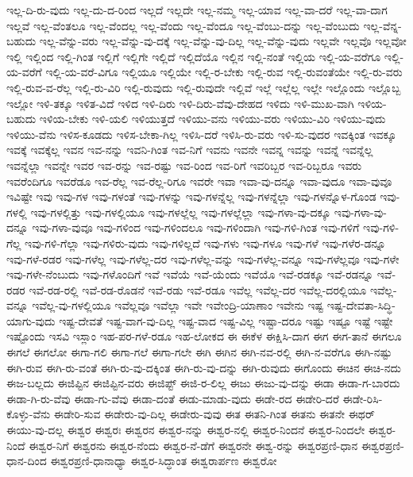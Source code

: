 {ಇಲ್ಲ-ದಿ-ರು-ವುದು
ಇಲ್ಲ-ದು-ದ-ರಿಂದ
ಇಲ್ಲದೆ
ಇಲ್ಲದೇ
ಇಲ್ಲ-ನಮ್ಮ
ಇಲ್ಲ-ಯಾವ
ಇಲ್ಲ-ವಾ-ದರೆ
ಇಲ್ಲ-ವಾ-ದಾಗ
ಇಲ್ಲವೆ
ಇಲ್ಲ-ವೆಂತಲೂ
ಇಲ್ಲ-ವೆಂದಲ್ಲ
ಇಲ್ಲ-ವೆಂದು
ಇಲ್ಲ-ವೆಂದೂ
ಇಲ್ಲ-ವೆಂಬು-ದನ್ನು
ಇಲ್ಲ-ವೆಂಬುದು
ಇಲ್ಲ-ವೆನ್ನ-ಬಹುದು
ಇಲ್ಲ-ವೆನ್ನು-ವರು
ಇಲ್ಲ-ವೆನ್ನು-ವು-ದಕ್ಕೆ
ಇಲ್ಲ-ವೆನ್ನು-ವು-ದಿಲ್ಲ
ಇಲ್ಲ-ವೆನ್ನು-ವುದು
ಇಲ್ಲವೇ
ಇಲ್ಲವೊ
ಇಲ್ಲವೋ
ಇಲ್ಲಿ
ಇಲ್ಲಿಂದ
ಇಲ್ಲಿ-ಗಿಂತ
ಇಲ್ಲಿಗೆ
ಇಲ್ಲಿಗೇ
ಇಲ್ಲಿದೆ
ಇಲ್ಲಿದೆಯೊ
ಇಲ್ಲಿನ
ಇಲ್ಲಿ-ನಂತೆ
ಇಲ್ಲಿಯ
ಇಲ್ಲಿ-ಯ-ವರೆಗೂ
ಇಲ್ಲಿ-ಯ-ವರೆಗೆ
ಇಲ್ಲಿ-ಯ-ವರೆ-ವಿಗೂ
ಇಲ್ಲಿಯೂ
ಇಲ್ಲಿಯೇ
ಇಲ್ಲಿ-ರ-ಬೇಕು
ಇಲ್ಲಿ-ರುವ
ಇಲ್ಲಿ-ರುವಂತೆಯೇ
ಇಲ್ಲಿ-ರು-ವರು
ಇಲ್ಲಿ-ರುವ-ವ-ರೆಲ್ಲ
ಇಲ್ಲಿ-ರು-ವಿರಿ
ಇಲ್ಲಿ-ರುವುದು
ಇಲ್ಲಿ-ರುವುದೇ
ಇಲ್ಲಿವೆ
ಇಲ್ಲೆ
ಇಲ್ಲೆಲ್ಲ
ಇಲ್ಲೇ
ಇಲ್ಲೊಂದು
ಇಲ್ಲೊಬ್ಬ
ಇಲ್ಲೋ
ಇಳಿ-ತಕ್ಕೂ
ಇಳಿತ-ವಿದೆ
ಇಳಿದ
ಇಳಿ-ದಿರು
ಇಳಿ-ದಿರು-ವೆವು-ದೇಹದ
ಇಳಿದು
ಇಳಿ-ಮುಖ-ವಾಗಿ
ಇಳಿಯ-ಬಹುದು
ಇಳಿಯ-ಬೇಕು
ಇಳಿ-ಯಲಿ
ಇಳಿಯುತ್ತದೆ
ಇಳಿಯು-ವನು
ಇಳಿಯು-ವರು
ಇಳಿಯು-ವಿರಿ
ಇಳಿಯು-ವುದು
ಇಳಿಯು-ವೆನು
ಇಳಿಸ-ಕೂಡದು
ಇಳಿಸ-ಬೇಕಾ-ಗಿಲ್ಲ
ಇಳಿಸಿ-ದರೆ
ಇಳಿಸಿ-ರು-ವರು
ಇಳಿ-ಸು-ವುದರ
ಇವಕ್ಕಿಂತ
ಇವಕ್ಕೂ
ಇವಕ್ಕೆ
ಇವಕ್ಕೆಲ್ಲ
ಇವನ
ಇವ-ನನ್ನು
ಇವನಿ-ಗಿಂತ
ಇವ-ನಿಗೆ
ಇವನು
ಇವನೇ
ಇವನ್ನ
ಇವನ್ನು
ಇವನ್ನೆ
ಇವನ್ನೆಲ್ಲ
ಇವನ್ನೆಲ್ಲಾ
ಇವನ್ನೇ
ಇವರ
ಇವ-ರನ್ನು
ಇವ-ರಷ್ಟು
ಇವ-ರಿಂದ
ಇವ-ರಿಗೆ
ಇವರಿಬ್ಬರ
ಇವ-ರಿಬ್ಬರೂ
ಇವರು
ಇವರೆಂದಿಗೂ
ಇವರೆಡೂ
ಇವ-ರೆಲ್ಲ
ಇವ-ರೆಲ್ಲ-ರಿಗೂ
ಇವರೇ
ಇವಾ
ಇವಾ-ವು-ದನ್ನೂ
ಇವಾ-ವುದೂ
ಇವಾ-ವುವೂ
ಇವಿಷ್ಟೇ
ಇವು
ಇವು-ಗಳ
ಇವು-ಗಳಂತೆ
ಇವು-ಗಳನ್ನು
ಇವು-ಗಳನ್ನೆಲ್ಲ
ಇವು-ಗಳನ್ನೆಲ್ಲಾ
ಇವು-ಗಳನ್ನೊಳ-ಗೊಂಡ
ಇವು-ಗಳಲ್ಲಿ
ಇವು-ಗಳಲ್ಲಿತ್ತು
ಇವು-ಗಳಲ್ಲಿಯೂ
ಇವು-ಗಳಲ್ಲೆಲ್ಲ
ಇವು-ಗಳಲ್ಲೆಲ್ಲಾ
ಇವು-ಗಳಾ-ವು-ದಕ್ಕೂ
ಇವು-ಗಳಾ-ವು-ದನ್ನೂ
ಇವು-ಗಳಾ-ವುವೂ
ಇವು-ಗಳಿಂದ
ಇವು-ಗಳಿಂದಲೂ
ಇವು-ಗಳಿಂದಾಗಿ
ಇವು-ಗಳಿ-ಗಿಂತ
ಇವು-ಗಳಿಗೆ
ಇವು-ಗಳಿ-ಗೆಲ್ಲ
ಇವು-ಗಳಿ-ಗೆಲ್ಲಾ
ಇವು-ಗಳಿರು-ವುದು
ಇವು-ಗಳಿಲ್ಲದೆ
ಇವು-ಗಳು
ಇವು-ಗಳೂ
ಇವು-ಗಳೆ
ಇವು-ಗಳೆರ-ಡನ್ನೂ
ಇವು-ಗಳೆ-ರಡರ
ಇವು-ಗಳೆಲ್ಲ
ಇವು-ಗಳೆಲ್ಲ-ದರ
ಇವು-ಗಳೆಲ್ಲ-ವನ್ನು
ಇವು-ಗಳೆಲ್ಲ-ವನ್ನೂ
ಇವು-ಗಳೆಲ್ಲವೂ
ಇವು-ಗಳೇ
ಇವು-ಗಳೇ-ನೆಂಬುದು
ಇವು-ಗಳೊಂದಿಗೆ
ಇವೆ
ಇವೆಯೆ
ಇವೆ-ಯೆಂದು
ಇವೆಯೊ
ಇವೆ-ರಡಕ್ಕೂ
ಇವೆ-ರಡನ್ನೂ
ಇವೆ-ರಡರ
ಇವೆ-ರಡ-ರಲ್ಲಿ
ಇವೆ-ರಡ-ರೊಡನೆ
ಇವೆ-ರಡು
ಇವೆ-ರಡೂ
ಇವೆಲ್ಲ
ಇವೆಲ್ಲ-ದರ
ಇವೆಲ್ಲ-ದರಲ್ಲಿಯೂ
ಇವೆಲ್ಲ-ವನ್ನೂ
ಇವೆಲ್ಲ-ವು-ಗಳಲ್ಲಿಯೂ
ಇವೆಲ್ಲವೂ
ಇವೆಲ್ಲಾ
ಇವೇ
ಇವೇಂದ್ರಿ-ಯಾಣಾಂ
ಇವೇನು
ಇಷ್ಟ
ಇಷ್ಟ-ದೇವತಾ-ಸಿದ್ಧಿ-ಯಾಗು-ವುದು
ಇಷ್ಟ-ದೇವತೆ
ಇಷ್ಟ-ವಾಗ-ವು-ದಿಲ್ಲ
ಇಷ್ಟ-ವಾದ
ಇಷ್ಟ-ವಿಲ್ಲ
ಇಷ್ಟಾ-ದರೂ
ಇಷ್ಟು
ಇಷ್ಟೂ
ಇಷ್ಟೆ
ಇಷ್ಟೇ
ಇಷ್ಟೊಂದು
ಇಸವಿ
ಇಸ್ಲಾಂ
ಇಹ-ಪರ-ಗಳೆ-ರಡೂ
ಇಹ-ಲೋಕದ
ಈ
ಈಕೆಳ
ಈಕ್ಷಿಸಿ-ದಾಗ
ಈಗ
ಈಗ-ತಾನೆ
ಈಗಲೂ
ಈಗಲೆ
ಈಗಲೋ
ಈಗಾ-ಗಲಿ
ಈಗಾ-ಗಲೆ
ಈಗಾ-ಗಲೇ
ಈಗಿ
ಈಗಿನ
ಈಗಿ-ನವ-ರಲ್ಲಿ
ಈಗಿ-ನ-ವರೆಗೂ
ಈಗಿ-ನಷ್ಟು
ಈಗಿ-ರುವ
ಈಗಿ-ರು-ವಂತೆ
ಈಗಿ-ರು-ವು-ದಕ್ಕಿಂತ
ಈಗಿ-ರು-ವು-ದನ್ನು
ಈಗಿ-ರುವುದು
ಈಗೊಂದು
ಈಚಿನ
ಈಚಿ-ನದು
ಈಜ-ಬಲ್ಲದು
ಈಜಿಪ್ಟಿನ
ಈಜಿಪ್ಟಿನ-ವರು
ಈಜಿಪ್ಟ್
ಈಜಿ-ರ-ಲಿಲ್ಲ
ಈಜು
ಈಜು-ವು-ದನ್ನು
ಈಡಾ
ಈಡಾ-ಗ-ಬಾರದು
ಈಡಾ-ಗಿ-ರು-ವೆವು
ಈಡಾ-ಗು-ವೆವು
ಈಡಾ-ದಂತೆ
ಈಡು-ಮಾಡು-ವುದು
ಈಡೇ-ರದ
ಈಡೇರಿ-ದರೆ
ಈಡೇ-ರಿಸಿ-ಕೊಳ್ಳು-ವೆನು
ಈಡೇರಿ-ಸುವ
ಈಡೇರು-ವು-ದಿಲ್ಲ
ಈಡೇರು-ವುವು
ಈತ
ಈತನಿ-ಗಿಂತ
ಈತನು
ಈತನೇ
ಈಥರ್
ಈಯು-ವು-ದಲ್ಲ
ಈಶ್ವರ
ಈಶ್ವರಃ
ಈಶ್ವರನ
ಈಶ್ವರ-ನನ್ನು
ಈಶ್ವರ-ನಲ್ಲಿ
ಈಶ್ವರ-ನಿಂದನೆ
ಈಶ್ವರ-ನಿಂದಲೇ
ಈಶ್ವರ-ನಿಂದೆ
ಈಶ್ವರ-ನಿಗೆ
ಈಶ್ವರನು
ಈಶ್ವರ-ನೆಂದು
ಈಶ್ವರ-ನೆ-ಡೆಗೆ
ಈಶ್ವರನೇ
ಈಶ್ವ-ರನ್ನು
ಈಶ್ವರಪ್ರಣಿ-ಧಾನ
ಈಶ್ವರಪ್ರಣಿ-ಧಾನ-ದಿಂದ
ಈಶ್ವರಪ್ರಣಿ-ಧಾನಾಧ್ಯಾ
ಈಶ್ವರ-ಸಿದ್ಧಾಂತ
ಈಶ್ವರಾರ್ಪಣ
ಈಶ್ವರೋ
}

